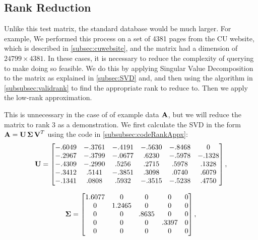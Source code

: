 \subsection{Rank Reduction}\label{subsec:rankreduction}
Unlike this test matrix, the standard database would be much larger. For example, We performed this process on a set of 4381 pages from the CU website, which is described in \autoref{subsec:cuwebsite}, and the matrix had a dimension of $24799\times4381$. In these cases, it is necessary to reduce the complexity of querying to make doing so feasible. We do this by applying Singular Value Decomposition to the matrix as explained in \autoref{subsec:SVD} and, and then using the algorithm in \autoref{subsubsec:validrank} to find the appropriate rank to reduce to. Then we apply the low-rank approximation. 



This is unnecessary in the case of of example data $\operatorname{\mathbf{A}}$, but we will reduce the matrix to rank 3 as a demonstration. We first calculate the SVD in the form $\operatorname{\mathbf{A}} = \operatorname{\mathbf{U}} \operatorname{\mathbf{\Sigma}}  \operatorname{\mathbf{V}}^T$ using the code in \autoref{subsubsec:codeRankAppx}:
\begin{equation}\label{eq:matUPreRankReduce}
\operatorname{\mathbf{U}}=
\begin{bmatrix}
-.6049 & -.3761 & -.4191 & -.5630 & -.8468 & 0 \\
-.2967 & -.3799 & -.0677 & .6230 & -.5978 & -.1328 \\
-.4309 & -.2990 & .5256 & .2715 & .5978 & .1328 \\
-.3412 & .5141 & -.3851 & .3098 & .0740 & .6079 \\
-.1341 & .0808 & .5932 & -.3515 & -.5238 & .4750 \\
\end{bmatrix},
\end{equation}

\begin{equation}\label{eq:matDPreRankReduce}
\operatorname{\mathbf{\Sigma}}=
    \begin{bmatrix}
    1.6077 & 0 & 0 & 0 & 0 \\
    0 & 1.2465 & 0 & 0 & 0 \\
    0 & 0 & .8635 & 0 & 0 \\
    0 & 0 & 0 & .3397 & 0 \\
    0 & 0 & 0 & 0 & 0 \\
    \end{bmatrix},
\end{equation}

